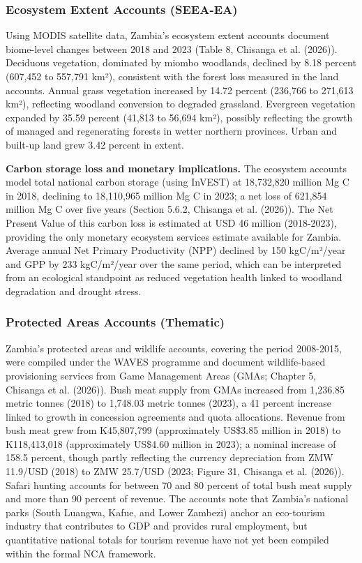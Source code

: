 \documentclass[
  letterpaper,
  DIV=11,
  numbers=noendperiod]{scrartcl}
\begin{document}
\subsubsection{Ecosystem Extent Accounts
(SEEA-EA)}\label{ecosystem-extent-accounts-seea-ea}

Using MODIS satellite data, Zambia's ecosystem extent accounts document
biome-level changes between 2018 and 2023 (Table 8, Chisanga et al.
(2026)). Deciduous vegetation, dominated by miombo woodlands, declined
by 8.18 percent (607,452 to 557,791 km²), consistent with the forest
loss measured in the land accounts. Annual grass vegetation increased by
14.72 percent (236,766 to 271,613 km²), reflecting woodland conversion
to degraded grassland. Evergreen vegetation expanded by 35.59 percent
(41,813 to 56,694 km²), possibly reflecting the growth of managed and
regenerating forests in wetter northern provinces. Urban and built-up
land grew 3.42 percent in extent.

\textbf{Carbon storage loss and monetary implications.} The ecosystem
accounts model total national carbon storage (using InVEST) at
18,732,820 million Mg C in 2018, declining to 18,110,965 million Mg C in
2023; a net loss of 621,854 million Mg C over five years (Section 5.6.2,
Chisanga et al. (2026)). The Net Present Value of this carbon loss is
estimated at USD 46 million (2018-2023), providing the only monetary
ecosystem services estimate available for Zambia. Average annual Net
Primary Productivity (NPP) declined by 150 kgC/m²/year and GPP by 233
kgC/m²/year over the same period, which can be interpreted from an
ecological standpoint as reduced vegetation health linked to woodland
degradation and drought stress.

\subsubsection{Protected Areas Accounts
(Thematic)}\label{protected-areas-accounts-thematic}

Zambia's protected areas and wildlife accounts, covering the period
2008-2015, were compiled under the WAVES programme and document
wildlife-based provisioning services from Game Management Areas (GMAs;
Chapter 5, Chisanga et al. (2026)). Bush meat supply from GMAs increased
from 1,236.85 metric tonnes (2018) to 1,748.03 metric tonnes (2023), a
41 percent increase linked to growth in concession agreements and quota
allocations. Revenue from bush meat grew from K45,807,799 (approximately
US\$3.85 million in 2018) to K118,413,018 (approximately US\$4.60
million in 2023); a nominal increase of 158.5 percent, though partly
reflecting the currency depreciation from ZMW 11.9/USD (2018) to ZMW
25.7/USD (2023; Figure 31, Chisanga et al. (2026)). Safari hunting
accounts for between 70 and 80 percent of total bush meat supply and
more than 90 percent of revenue. The accounts note that Zambia's
national parks (South Luangwa, Kafue, and Lower Zambezi) anchor an
eco-tourism industry that contributes to GDP and provides rural
employment, but quantitative national totals for tourism revenue have
not yet been compiled within the formal NCA framework.
\end{document}
